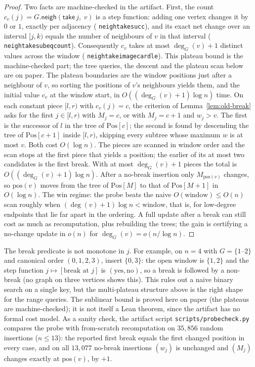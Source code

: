 \documentclass[11pt]{article}
\theoremstyle{definition}
\theoremstyle{remark}
\newcommand{\leanname}[1]{%
  \texttt{\begingroup\def\_{\textunderscore\allowbreak}#1\endgroup}}
\newcommand{\neigh}{\mathsf{neigh}}
\begin{document}
\begin{proof}
Two facts are machine-checked in the artifact. First, the count
$c_v(j)=G.\neigh(\mathsf{take}\,j,\;v)$ is a step function: adding one vertex
changes it by $0$ or $1$, exactly per adjacency
(\leanname{neigh\_take\_succ}), and its exact net change over an interval
$[j,k)$ equals the number of neighbours of $v$ in that interval
(\leanname{neigh\_take\_sub\_eq\_count}). Consequently $c_v$ takes at most
$\deg_G(v)+1$ distinct values across the window
(\leanname{neigh\_take\_image\_card\_le}). This plateau bound is the
machine-checked part; the tree queries, the descent and the plateau scan below
are on paper. The plateau boundaries are the window positions just after a neighbour
of $v$, so sorting the positions of $v$'s neighbours yields them, and the initial
value $c_v$ at the window start, in $O((\deg_G(v)+1)\log n)$ time. On each
constant piece $[l,r)$ with $c_v(j)=c$, the criterion of
Lemma~\ref{lem:old-break} asks for the first $j\in[l,r)$ with $M_j=c$, or with
$M_j=c+1$ and $w_j>v$. The first is the successor of $l$ in the tree of
$\mathrm{Pos}[c]$; the second is found by descending the tree of
$\mathrm{Pos}[c+1]$ inside $[l,r)$, skipping every subtree whose maximum $w$ is
at most $v$. Both cost $O(\log n)$. The pieces are scanned in window order and
the scan stops at the first piece that yields a position; the earlier of its at
most two candidates is the first break. With at most $\deg_G(v)+1$ pieces the
total is $O((\deg_G(v)+1)\log n)$. After a no-break insertion only $M_{\mathrm{pos}(v)}$
changes, so $\mathrm{pos}(v)$ moves from the tree of $\mathrm{Pos}[M]$ to that of
$\mathrm{Pos}[M+1]$ in $O(\log n)$. The
win regime: the probe beats the naive $O(\text{window})\le O(n)$ scan roughly
when $(\deg(v)+1)\log n < \text{window}$, that is, for low-degree endpoints that lie
far apart in the ordering. A full update after a break can still cost as much
as recomputation, plus rebuilding the trees; the gain is certifying a no-change
update in $o(n)$ for $\deg_G(v)=o(n/\log n)$.
\end{proof}

The break predicate is not monotone in $j$. For example, on $n=4$ with
$G=\{1\text{--}2\}$ and canonical order $(0,1,2,3)$, insert $\{0,3\}$: the open
window is $\{1,2\}$ and the step function $j\mapsto[\text{break at }j]$ is
$(\text{yes},\text{no})$, so a break is followed by a non-break (no graph on
three vertices shows this). This rules out a naive
binary search on a single key, but the multi-plateau structure above is the
right shape for the range queries. The sublinear bound is proved here on paper
(the plateaus are machine-checked); it is not itself a Lean theorem, since the
artifact has no formal cost model. As a sanity check, the artifact script
\leanname{scripts/probe\_check.py} compares the probe with from-scratch
recomputation on $35{,}856$ random insertions ($n\le 13$): the reported first
break equals the first changed position in every case, and on all $13{,}077$
no-break insertions $(w_j)$ is unchanged and $(M_j)$ changes exactly at
$\mathrm{pos}(v)$, by $+1$.
\end{document}
